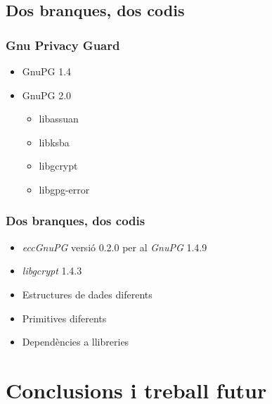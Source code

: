 \documentclass{beamer}
\theoremstyle{saltolinea}   			%
\begin{document}
\subsection{Dos branques, dos codis}

\begin{frame}
  \frametitle{Gnu Privacy Guard}
  \begin{itemize}
    \item<2-> GnuPG 1.4
    \item<3-> GnuPG 2.0
    \begin{itemize}
      \item<4-> libassuan
      \item<5-> libksba
      \item<6-> libgcrypt
      \item<7-> libgpg-error
    \end{itemize}
  \end{itemize}
\end{frame}

\begin{frame}
  \frametitle{Dos branques, dos codis}
  \begin{itemize}
    \item<2-> \emph{eccGnuPG} versi\'o 0.2.0 per al \emph{GnuPG} 1.4.9
    \item<3-> \emph{libgcrypt} 1.4.3
  \end{itemize}
  \begin{itemize}
    \item<4-> Estructures de dades diferents
    \item<5-> Primitives diferents
    \item<6-> Depend\`encies a llibreries
  \end{itemize}
\end{frame}

\section{Conclusions i treball futur}
\end{document}
